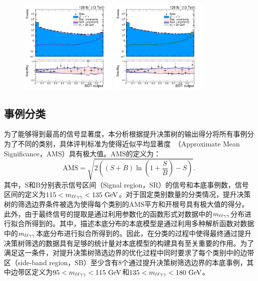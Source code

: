 \begin{figure}[htbp]
  \begin{center}
		\includegraphics[width=0.42\textwidth]{figures/chapter04/BDT_score/mvaVal_M25_log.png}
        \includegraphics[width=0.42\textwidth]{figures/chapter04/BDT_score/mvaVal_M30_log.png} \\
    \label{fig:BDT_score3}
\end{center}
\end{figure}

\subsection{事例分类}

为了能够得到最高的信号显著度，本分析根据提升决策树的输出得分将所有事例分为了不同的类别，具体评判标准为使得近似平均显著度~\cite{Cowan:2010js}（Approximate Mean Significance，AMS）具有极大值。AMS的定义为：
\begin{equation}
    \textrm{AMS} = \sqrt{2((S+B)\ln{(1+\frac{S}{B})} - S)}\label{con:AMS}.
\end{equation}
其中，S和B分别表示信号区间（Signal region，SR）的信号和本底事例数，信号区间的定义为$115 <\mllgg< 135\GeV$。对于固定类别数量的分类情况，提升决策树的筛选边界条件被选为使得每个类别的AMS平方和开根号具有极大值的得分。此外，由于最终信号的提取是通过利用参数化的函数形式对数据中的$m_{\ell\ell\gamma\gamma}$分布进行拟合所得到的。其中，描述本底分布的本底模型是通过利用多种解析函数对数据中的$m_{\ell\ell\gamma\gamma}$本底分布进行拟合所得到的。因此，在分类的过程中使得最终通过提升决策树筛选的数据具有足够的统计量对本底模型的构建具有至关重要的作用。为了满足这一条件，对提升决策树筛选边界的优化过程中同时要求了每个类别中的边带区（side-band region，SB）至少含有8个通过提升决策树筛选边界的本底事例，其中边带区定义为$95 <\mllgg< 115\GeV$和$135 <\mllgg< 180\GeV$。

